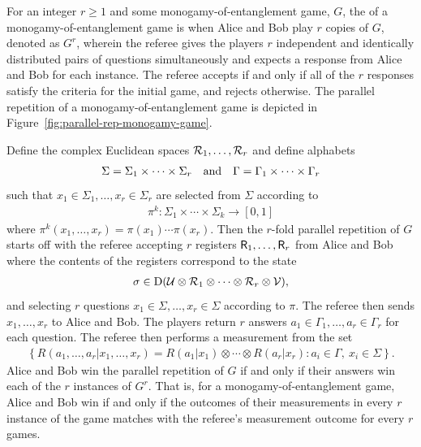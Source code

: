 For an integer $r \geq 1$ and some monogamy-of-entanglement game, $G$, the  of a monogamy-of-entanglement game is when Alice and Bob play $r$ copies of $G$, denoted as $G^r$, wherein the referee gives the players $r$ independent and identically distributed pairs of questions simultaneously and expects a response from Alice and Bob for each instance. The referee accepts if and only if all of the $r$ responses satisfy the criteria for the initial game, and rejects otherwise. The parallel repetition of a monogamy-of-entanglement game is depicted in Figure~\ref{fig:parallel-rep-monogamy-game}. 

Define the complex Euclidean spaces $\mathcal{R}_1, \ldots, \mathcal{R}_r$ and define alphabets 
\begin{align}
	\Sigma = \Sigma_1 \times \cdots \times \Sigma_r \quad \textnormal{and} \quad \Gamma = \Gamma_1 \times \cdots \times \Gamma_r
\end{align}
such that $x_1 \in \Sigma_1, \ldots, x_r \in \Sigma_r$ are selected from $\Sigma$ according to 
\begin{align}
	\pi^k : \Sigma_1 \times \cdots \times \Sigma_k \rightarrow [0,1]
\end{align}
where $\pi^k(x_1, \ldots, x_r) = \pi(x_1) \cdots \pi(x_r)$. Then the $r$-fold parallel repetition of $G$ starts off with the referee accepting $r$ registers $\mathsf{R}_1, \ldots, \mathsf{R}_r$ from Alice and Bob where the contents of the registers correspond to the state 
\begin{align}
	\sigma \in \mathrm{D}(\mathcal{U} \otimes \mathcal{R}_1 \otimes \cdots \otimes \mathcal{R}_r \otimes \mathcal{V}),
\end{align}
and selecting $r$ questions $x_1 \in \Sigma, \ldots, x_r \in \Sigma$ according to $\pi$. The referee then sends $x_1, \ldots, x_r$ to Alice and Bob. The players return $r$ answers $a_1 \in \Gamma_1, \ldots, a_r \in \Gamma_r$ for each question. The referee then performs a measurement from the set 
\begin{align} \label{eq:monog-parallel-rep-ref-ops}
	\left \{ R(a_1, \ldots, a_r|x_1, \ldots, x_r) = R(a_1|x_1) \otimes \cdots \otimes R(a_r|x_r) : a_i \in \Gamma, \ x_i \in \Sigma \right \}.
\end{align}
Alice and Bob win the parallel repetition of $G$ if and only if their answers win each of the $r$ instances of $G^r$. That is, for a monogamy-of-entanglement game, Alice and Bob win if and only if the outcomes of their measurements in every $r$ instance of the game matches with the referee's measurement outcome for every $r$ games. 

